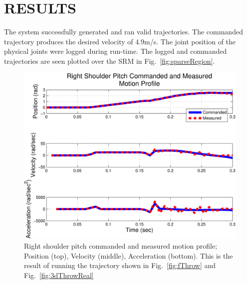 \section{RESULTS}\label{sec:reslts}
The system successfully generated and ran valid trajectories.  The commanded trajectory produces the desired velocity of 4.9m/s.  The joint position of the physical joints were logged during run-time.  
The logged and commanded trajectories are seen plotted over the SRM in Fig.~\ref{fig:sparseRegion}.  


\begin{figure}[thpb]
  \centering
\includegraphics[width=1.0\columnwidth]{./MATLAB/throwTrajRSPplot.pdf}
  \caption{Right shoulder pitch commanded and measured motion profile; Position (top), Velocity (middle), Acceleration (bottom).  This is the result of running the trajectory shown in Fig.~\ref{fig:fThrow} and Fig.~\ref{fig:3dThrowReal}}
  \label{fig:velosPlot}
\end{figure}



